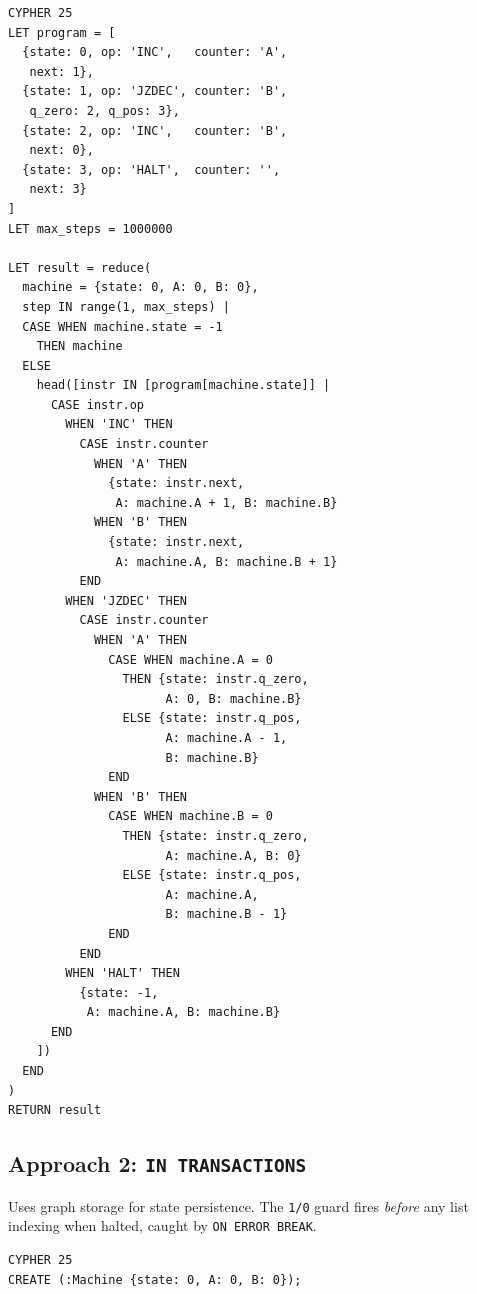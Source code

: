 \documentclass[9pt,a4paper,twocolumn]{article}
\begin{document}
\begin{smallcode}
\begin{lstlisting}[style=cypher-dense]
CYPHER 25
LET program = [
  {state: 0, op: 'INC',   counter: 'A',
   next: 1},
  {state: 1, op: 'JZDEC', counter: 'B',
   q_zero: 2, q_pos: 3},
  {state: 2, op: 'INC',   counter: 'B',
   next: 0},
  {state: 3, op: 'HALT',  counter: '',
   next: 3}
]
LET max_steps = 1000000

LET result = reduce(
  machine = {state: 0, A: 0, B: 0},
  step IN range(1, max_steps) |
  CASE WHEN machine.state = -1
    THEN machine
  ELSE
    head([instr IN [program[machine.state]] |
      CASE instr.op
        WHEN 'INC' THEN
          CASE instr.counter
            WHEN 'A' THEN
              {state: instr.next,
               A: machine.A + 1, B: machine.B}
            WHEN 'B' THEN
              {state: instr.next,
               A: machine.A, B: machine.B + 1}
          END
        WHEN 'JZDEC' THEN
          CASE instr.counter
            WHEN 'A' THEN
              CASE WHEN machine.A = 0
                THEN {state: instr.q_zero,
                      A: 0, B: machine.B}
                ELSE {state: instr.q_pos,
                      A: machine.A - 1,
                      B: machine.B}
              END
            WHEN 'B' THEN
              CASE WHEN machine.B = 0
                THEN {state: instr.q_zero,
                      A: machine.A, B: 0}
                ELSE {state: instr.q_pos,
                      A: machine.A,
                      B: machine.B - 1}
              END
          END
        WHEN 'HALT' THEN
          {state: -1,
           A: machine.A, B: machine.B}
      END
    ])
  END
)
RETURN result
\end{lstlisting}
\end{smallcode}

\subsection{Approach 2: \texttt{IN TRANSACTIONS}}

Uses graph storage for state persistence.
The \texttt{1/0} guard fires \emph{before} any list indexing when
halted, caught by \texttt{ON ERROR BREAK}.

\begin{smallcode}
\begin{lstlisting}[style=cypher-dense]
CYPHER 25
CREATE (:Machine {state: 0, A: 0, B: 0});
\end{lstlisting}
\end{smallcode}
\end{document}
